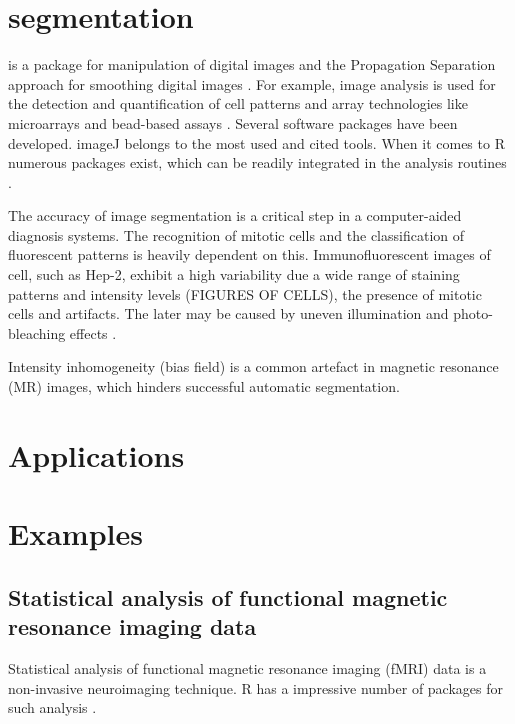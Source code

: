 \section{segmentation}

\citep{holmes_interactive_2009}

 is a package for manipulation of digital images and the 
Propagation Separation approach for smoothing digital images \citep{polzehl_adaptive_2007}.
For example, image analysis is used for the detection and quantification of 
cell patterns and array technologies like microarrays and bead-based assays 
\citep{dunning_beadarray:_2006, rodiger_highly_2013, willitzki_new_2012, willitzki_fully_2013}.
Several software packages have been developed. imageJ belongs to the most 
used and cited tools. When it comes to R numerous packages exist, which can 
be readily integrated in the analysis routines \citep{frery_introduction_2013}.

The accuracy of image segmentation is a critical step in a computer-aided 
diagnosis systems. The recognition of mitotic cells and the classification of 
fluorescent patterns is heavily dependent on this. Immunofluorescent images 
of cell, such as Hep-2, exhibit a high variability due a wide range of staining 
patterns and intensity levels (FIGURES OF CELLS), the presence of mitotic 
cells and  artifacts. The later may be caused by uneven illumination and 
photo-bleaching effects \citep{tonti_automated_2015}.

Intensity inhomogeneity (bias field) is a common artefact in magnetic resonance 
(MR) images, which hinders successful automatic segmentation. \citep{ivanovska_efficient_2016}

\section{Applications}

\section{Examples}
\subsection{Statistical analysis of functional magnetic resonance imaging data}

Statistical analysis of functional magnetic resonance imaging (fMRI) data  is a 
non-invasive neuroimaging technique. R has a impressive number of packages for 
such analysis \citep{tabelow_special_2011}.

